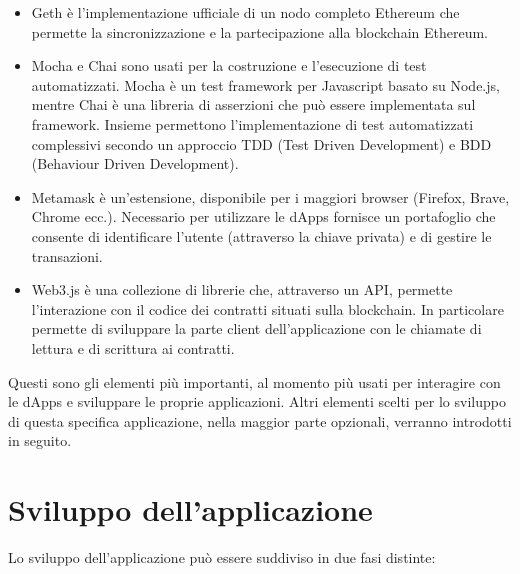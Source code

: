 \begin{itemize}
Truffle fornisce anche il codice \emph{boilerplate} ragruppato in diversi pacchetti chiamati "boxes" utili per uno sviluppo accelerato\footnote{Come base di questo progetto si è scelto il pacchetto chiamato pet-shop disponibile su https://truffleframework.com/boxes/pet-shop}.

\item Geth è l'implementazione ufficiale di un nodo completo Ethereum che permette la sincronizzazione e la partecipazione alla blockchain Ethereum.

\item Mocha e Chai sono usati per la costruzione e l'esecuzione di test automatizzati. Mocha è un test framework per Javascript basato su Node.js, mentre Chai è una libreria di asserzioni che può essere implementata sul framework. Insieme permettono l'implementazione di test automatizzati complessivi secondo un approccio TDD (Test Driven Development) e BDD (Behaviour Driven Development).

\item Metamask è un’estensione, disponibile per i maggiori browser (Firefox, Brave, Chrome ecc.). Necessario per utilizzare le dApps fornisce un portafoglio che consente di identificare l'utente (attraverso la chiave privata) e di gestire le transazioni.

\item Web3.js è una collezione di librerie che, attraverso un API, permette l'interazione con il codice dei contratti situati sulla blockchain. In particolare permette di sviluppare la parte client dell'applicazione con le chiamate di lettura e di scrittura ai contratti.

\end{itemize}

Questi sono gli elementi più importanti, al momento più usati per interagire con le dApps e sviluppare le proprie applicazioni. Altri elementi scelti per lo sviluppo di questa specifica applicazione, nella maggior parte opzionali, verranno introdotti in seguito.

\section{Sviluppo dell'applicazione}

Lo sviluppo dell'applicazione può essere suddiviso in due fasi distinte:

